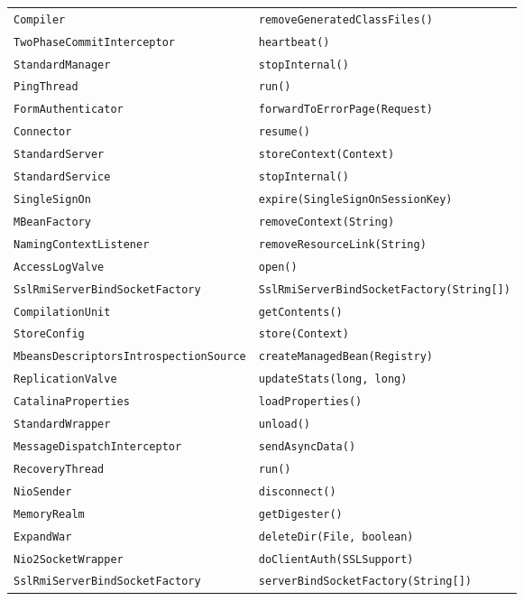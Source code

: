 \begin{center}
\begin{longtable}{ll}
\lstinline/Compiler/&{\lstinline/removeGeneratedClassFiles()/}\\
\lstinline/TwoPhaseCommitInterceptor/&{\lstinline/heartbeat()/}\\
\lstinline/StandardManager/&{\lstinline/stopInternal()/}\\
\lstinline/PingThread/&{\lstinline/run()/}\\
\lstinline/FormAuthenticator/&{\lstinline/forwardToErrorPage(Request)/}\\
\lstinline/Connector/&{\lstinline/resume()/}\\
\lstinline/StandardServer/&{\lstinline/storeContext(Context)/}\\
\lstinline/StandardService/&{\lstinline/stopInternal()/}\\
\lstinline/SingleSignOn/&{\lstinline/expire(SingleSignOnSessionKey)/}\\
\lstinline/MBeanFactory/&{\lstinline/removeContext(String)/}\\
\lstinline/NamingContextListener/&{\lstinline/removeResourceLink(String)/}\\
\lstinline/AccessLogValve/&{\lstinline/open()/}\\
\lstinline/SslRmiServerBindSocketFactory/&{\lstinline/SslRmiServerBindSocketFactory(String[])/}\\
\lstinline/CompilationUnit/&{\lstinline/getContents()/}\\
\lstinline/StoreConfig/&{\lstinline/store(Context)/}\\
\lstinline/MbeansDescriptorsIntrospectionSource/&{\lstinline/createManagedBean(Registry)/}\\
\lstinline/ReplicationValve/&{\lstinline/updateStats(long, long)/}\\
\lstinline/CatalinaProperties/&{\lstinline/loadProperties()/}\\
\lstinline/StandardWrapper/&{\lstinline/unload()/}\\
\lstinline/MessageDispatchInterceptor/&{\lstinline/sendAsyncData()/}\\
\lstinline/RecoveryThread/&{\lstinline/run()/}\\
\lstinline/NioSender/&{\lstinline/disconnect()/}\\
\lstinline/MemoryRealm/&{\lstinline/getDigester()/}\\
\lstinline/ExpandWar/&{\lstinline/deleteDir(File, boolean)/}\\
\lstinline/Nio2SocketWrapper/&{\lstinline/doClientAuth(SSLSupport)/}\\
\lstinline/SslRmiServerBindSocketFactory/&{\lstinline/serverBindSocketFactory(String[])/}\\

\end{longtable}
\end{center}
